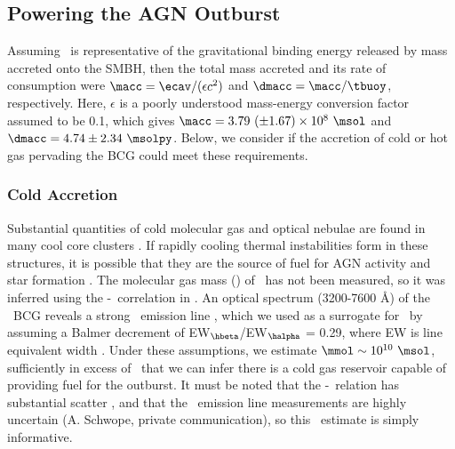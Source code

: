 \documentclass[11pt, preprint]{aastex}
\begin{document}
\subsection{Powering the AGN Outburst}
\label{sec:accretion}

Assuming \ecav\ is representative of the gravitational binding energy
released by mass accreted onto the SMBH, then the total mass accreted
and its rate of consumption were $\macc = \ecav/(\epsilon c^2)$ and
$\dmacc = \macc/\tbuoy$, respectively. Here, $\epsilon$ is a poorly
understood mass-energy conversion factor assumed to be 0.1, which
gives $\macc = 3.79 ~(\pm 1.67) \times 10^8 ~\msol$ and $\dmacc = 4.74
\pm 2.34 ~\msolpy$. Below, we consider if the accretion of cold or hot
gas pervading the BCG could meet these requirements.

\subsubsection{Cold Accretion}
\label{sec:cold}

Substantial quantities of cold molecular gas and optical nebulae are
found in many cool core clusters \citep{crawford99, edge01}. If
rapidly cooling thermal instabilities form in these structures, it is
possible that they are the source of fuel for AGN activity and star
formation \citep[\eg][]{pizzolato05, 2010arXiv1003.4181P}. The
molecular gas mass (\mmol) of \rbs\ has not been measured, so it was
inferred using the \mmol-\halpha\ correlation in \citet{edge01}. An
optical spectrum (3200-7600 \AA) of the \rbs\ BCG reveals a strong
\hbeta\ emission line \citep{rbs1, rbs2}, which we used as a surrogate
for \halpha\ by assuming a Balmer decrement of
EW$_{\hbeta}$/EW$_{\halpha}$ = 0.29, where EW is line equivalent width
\citep{2006ApJ...642..775M}. Under these assumptions, we estimate
$\mmol \sim 10^{10} ~\msol$, sufficiently in excess of \macc\ that we
can infer there is a cold gas reservoir capable of providing fuel for
the outburst. It must be noted that the \mmol-\halpha\ relation has
substantial scatter \citep{salome03}, and that the \rbs\ emission line
measurements are highly uncertain (A. Schwope, private communication),
so this \mmol\ estimate is simply informative.
\end{document}
